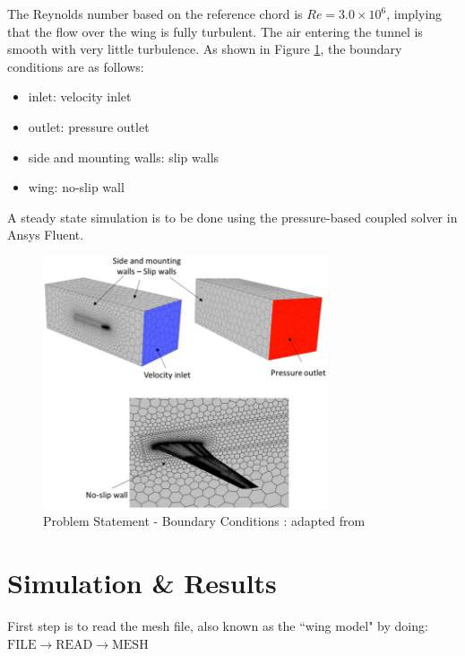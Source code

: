 \documentclass{article}
\begin{document}
The Reynolds number based on the reference chord is $Re = 3.0 \times 10^6$, implying that the flow over the wing is fully turbulent. The air entering the tunnel is smooth with very little turbulence. As shown in Figure \ref{img:boundaryConditions}, the boundary conditions are as follows:

\begin{itemize}
  \item inlet: velocity inlet
  \item outlet: pressure outlet
  \item side and mounting walls: slip walls
  \item wing: no-slip wall
\end{itemize}

A steady state simulation is to be done using the pressure-based coupled solver in Ansys Fluent.

\begin{figure}[h!]
	\centering
	\includegraphics[width=0.75\textwidth]{./img/boundaryConditions.png}
	\caption{Problem Statement - Boundary Conditions : adapted from \cite{ANSYSmodelWing}}
	\label{img:boundaryConditions}
\end{figure}

\section{Simulation \& Results}

First step is to read the mesh file, also known as the ``wing model" by doing: $\textrm{FILE} \rightarrow \textrm{READ} \rightarrow \textrm{MESH}$
\end{document}
